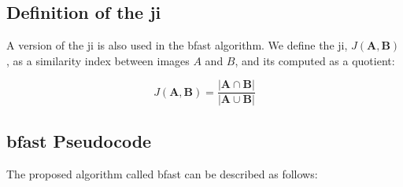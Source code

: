 \subsection{Definition of the \gls{ji}}

A version of the \gls{ji} is also used in the \gls{bfast} algorithm. We define the \gls{ji}, $J(\bm{A},\bm{B})$, as a similarity index between images $A$ and $B$, and its computed as a quotient:

\begin{equation}
J(\bm{A},\bm{B}) = \frac{|\bm{A} \cap \bm{B}|}{|\bm{A} \cup \bm{B}|}
\end{equation}

\subsection{\gls{bfast} Pseudocode}

The proposed algorithm called \gls{bfast} can be described as follows:

